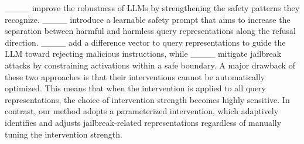 ____ improve the robustness of LLMs by strengthening the safety patterns they recognize.
____ introduce a learnable safety prompt that aims to increase the separation between harmful and harmless query representations along the refusal direction. 
____ add a difference vector to query representations to guide the LLM toward rejecting malicious instructions, while ____ mitigate jailbreak attacks by constraining activations within a safe boundary. 
A major drawback of these two approaches is that their interventions cannot be automatically optimized. This means that when the intervention is applied to all query representations, the choice of intervention strength becomes highly sensitive.   
In contrast, our method adopts a parameterized intervention, which adaptively identifies and adjusts jailbreak-related representations regardless of manually tuning the intervention strength.